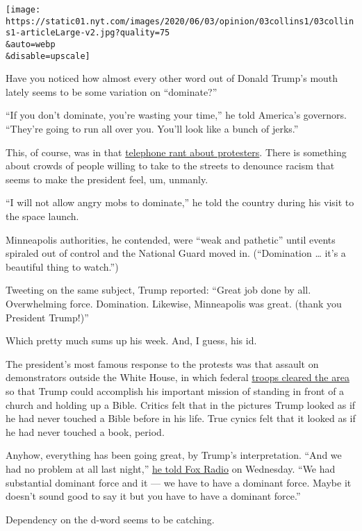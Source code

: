 \texttt{[image: https://static01.nyt.com/images/2020/06/03/opinion/03collins1/03collins1-articleLarge-v2.jpg?quality=75\\\&auto=webp\\\&disable=upscale]}

Have you noticed how almost every other word out of Donald Trump's mouth
lately seems to be some variation on ``dominate?''

``If you don't dominate, you're wasting your time,'' he told America's
governors. ``They're going to run all over you. You'll look like a bunch
of jerks.''

This, of course, was in that
\href{https://www.cnn.com/2020/06/01/politics/wh-governors-call-protests/index.html}{telephone
rant about protesters}. There is something about crowds of people
willing to take to the streets to denounce racism that seems to make the
president feel, um, unmanly.

``I will not allow angry mobs to dominate,'' he told the country during
his visit to the space launch.

Minneapolis authorities, he contended, were ``weak and pathetic'' until
events spiraled out of control and the National Guard moved in.
(``Domination \ldots{} it's a beautiful thing to watch.'')

Tweeting on the same subject, Trump reported: ``Great job done by all.
Overwhelming force. Domination. Likewise, Minneapolis was great. (thank
you President Trump!)''

Which pretty much sums up his week. And, I guess, his id.

The president's most famous response to the protests was that assault on
demonstrators outside the White House, in which federal
\href{https://www.nytimes.com/2020/06/01/us/politics/trump-st-johns-church-bible.html}{troops
cleared the area} so that Trump could accomplish his important mission
of standing in front of a church and holding up a Bible. Critics felt
that in the pictures Trump looked as if he had never touched a Bible
before in his life. True cynics felt that it looked as if he had never
touched a book, period.

Anyhow, everything has been going great, by Trump's interpretation.
``And we had no problem at all last night,''
\href{https://radio.foxnews.com/2020/06/03/president-trump-on-the-brian-kilmeade-show/}{he
told Fox Radio} on Wednesday. ``We had substantial dominant force and it
--- we have to have a dominant force. Maybe it doesn't sound good to say
it but you have to have a dominant force.''

Dependency on the d-word seems to be catching.

